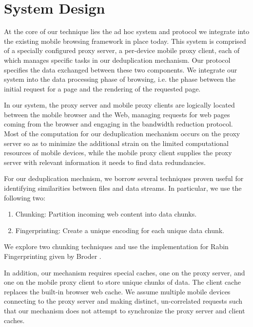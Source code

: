 \section{System Design}
\label{sec:sys_design}
At the core of our technique lies the ad hoc system and protocol we integrate into the existing mobile browsing framework in place today. This system is comprised of a specially configured proxy server, a per-device mobile proxy client, each of which manages specific tasks in our deduplication mechanism. Our protocol specifies the data exchanged between these two components. We integrate our system into the data processing phase of browsing, i.e. the phase between the initial request for a page and the rendering of the requested page.

In our system, the proxy server and mobile proxy clients are logically located between the mobile browser and the Web, managing requests for web pages coming from the browser and engaging in the bandwidth reduction protocol. Most of the computation for our deduplication mechanism occurs on the proxy server so as to minimize the additional strain on the limited computational resources of mobile devices, while the mobile proxy client supplies the proxy server with relevant information it needs to find data redundancies. 

For our deduplication mechnism, we borrow several techniques proven useful for identifying similarities between files and data streams. In particular, we use the following two: 
\begin{enumerate}
\item Chunking: Partition incoming web content into data chunks.
\item Fingerprinting: Create a unique encoding for each unique data chunk.
\end{enumerate}
We explore two chunking techniques and use the implementation for Rabin Fingerprinting given by Broder \cite{broder}. 

In addition, our mechanism requires special caches, one on the proxy server, and one on the mobile proxy client to store unique chunks of data. The client cache replaces the built-in browser web cache. We assume multiple mobile devices connecting to the proxy server and making distinct, un-correlated requests such that our mechanism does not attempt to synchronize the proxy server and client caches.




%

